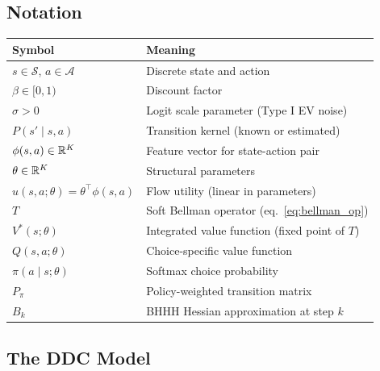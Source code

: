 \documentclass[11pt]{article}
\begin{document}
\subsection{Notation}

\begin{table}[h!]
\centering\small
\begin{tabular}{ll}
\toprule
Symbol & Meaning \\
\midrule
$s \in \mathcal{S}$, $a \in \mathcal{A}$ & Discrete state and action \\
$\beta \in [0,1)$ & Discount factor \\
$\sigma > 0$ & Logit scale parameter (Type I EV noise) \\
$P(s' \mid s,a)$ & Transition kernel (known or estimated) \\
$\phi(s,a) \in \mathbb{R}^K$ & Feature vector for state-action pair \\
$\theta \in \mathbb{R}^K$ & Structural parameters \\
$u(s,a;\theta) = \theta^\top \phi(s,a)$ & Flow utility (linear in parameters) \\
\midrule
$T$ & Soft Bellman operator (eq.~\ref{eq:bellman_op}) \\
$V^*(s;\theta)$ & Integrated value function (fixed point of $T$) \\
$Q(s,a;\theta)$ & Choice-specific value function \\
$\pi(a \mid s;\theta)$ & Softmax choice probability \\
$P_\pi$ & Policy-weighted transition matrix \\
$B_k$ & BHHH Hessian approximation at step $k$ \\
\bottomrule
\end{tabular}
\end{table}
\FloatBarrier

\subsection{The DDC Model}
\end{document}
